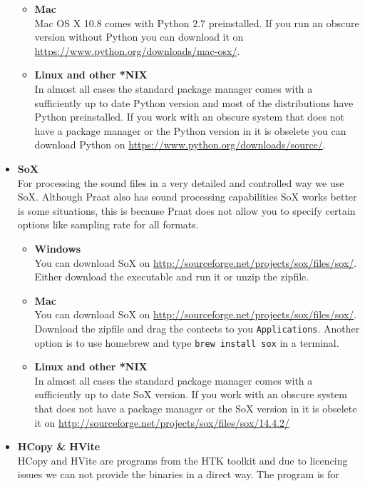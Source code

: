 \begin{itemize}
\begin{itemize}
			\item \textbf{Mac}\\
				Mac OS X 10.8 comes with Python $2.7$ preinstalled. If you run an
				obscure version without Python you can download it on 
				\url{https://www.python.org/downloads/mac-osx/}.
			\item \textbf{Linux and other *NIX}\\
				In almost all cases the standard package manager comes with a
				sufficiently up to date Python version and most of the distributions
				have Python preinstalled. If you work with an obscure system that does
				not have a package manager or the Python version in it is obselete you
				can download Python on \url{https://www.python.org/downloads/source/}.
		\end{itemize}
	\item \textbf{SoX}\\
		For processing the sound files in a very detailed and controlled way we
		use SoX. Although Praat also has sound processing capabilities SoX works
		better is some situations, this is because Praat does not allow you to
		specify certain options like sampling rate for all formats.
		\begin{itemize}
			\item \textbf{Windows}\\
				You can download SoX on
				\url{http://sourceforge.net/projects/sox/files/sox/}. Either download
				the executable and run it or unzip the zipfile.
			\item \textbf{Mac}\\
				You can download SoX on
				\url{http://sourceforge.net/projects/sox/files/sox/}. Download the
				zipfile and drag the contects to you \texttt{Applications}. Another
				option is to use homebrew and type \texttt{brew install sox} in a
				terminal.
			\item \textbf{Linux and other *NIX}\\
				In almost all cases the standard package manager comes with a
				sufficiently up to date SoX version. If you work with an obscure system
				that does not have a package manager or the SoX version in it is
				obselete it on 
				\url{http://sourceforge.net/projects/sox/files/sox/14.4.2/}
		\end{itemize}
	\item \textbf{HCopy \& HVite}\\
		HCopy and HVite are programs from the HTK toolkit and due to licencing
		issues we can not provide the binaries in a direct way. The program is for

\end{itemize}

